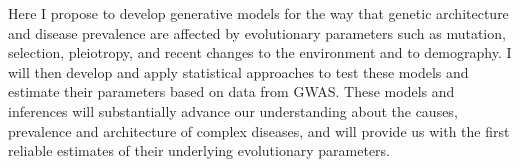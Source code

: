\documentclass[11pt]{article}
\begin{document}

Here I propose to develop generative models for the way that genetic architecture and disease prevalence are affected by evolutionary parameters such as mutation, selection, pleiotropy, and recent changes to the environment and to demography. I will then develop and apply statistical approaches to test these models and estimate their parameters based on data from GWAS. These models and inferences will substantially advance our understanding about the causes, prevalence and architecture of complex diseases, and will provide us with the first reliable estimates of their underlying evolutionary parameters.
\end{document}
